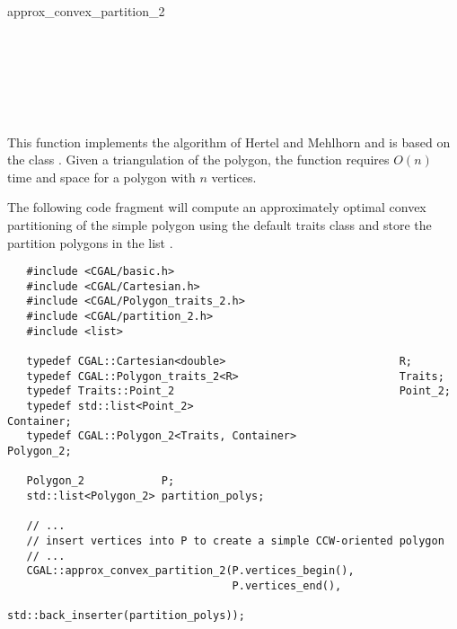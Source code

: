 \begin{ccRefFunction}{approx_convex_partition_2}
\ccSeeAlso

 \\
 \\
 \\
 \\
 \\

\ccImplementation
This function implements the algorithm of Hertel and Mehlhorn
\cite{hm-ftsp-83} and is based on the class 
.  Given a triangulation of
the polygon, the function requires $O(n)$ time and
space for a polygon with $n$ vertices.

\ccExample

The following code fragment will compute an approximately optimal
convex partitioning of the simple polygon  using the default
traits class and store the partition polygons in the list 
.

\begin{verbatim}
   #include <CGAL/basic.h>
   #include <CGAL/Cartesian.h>
   #include <CGAL/Polygon_traits_2.h>
   #include <CGAL/partition_2.h>
   #include <list>

   typedef CGAL::Cartesian<double>                           R;
   typedef CGAL::Polygon_traits_2<R>                         Traits;
   typedef Traits::Point_2                                   Point_2;
   typedef std::list<Point_2>                                Container;
   typedef CGAL::Polygon_2<Traits, Container>                Polygon_2;

   Polygon_2            P;
   std::list<Polygon_2> partition_polys;

   // ...
   // insert vertices into P to create a simple CCW-oriented polygon
   // ...
   CGAL::approx_convex_partition_2(P.vertices_begin(),
                                   P.vertices_end(),
                                   std::back_inserter(partition_polys));
\end{verbatim}

\end{ccRefFunction}
